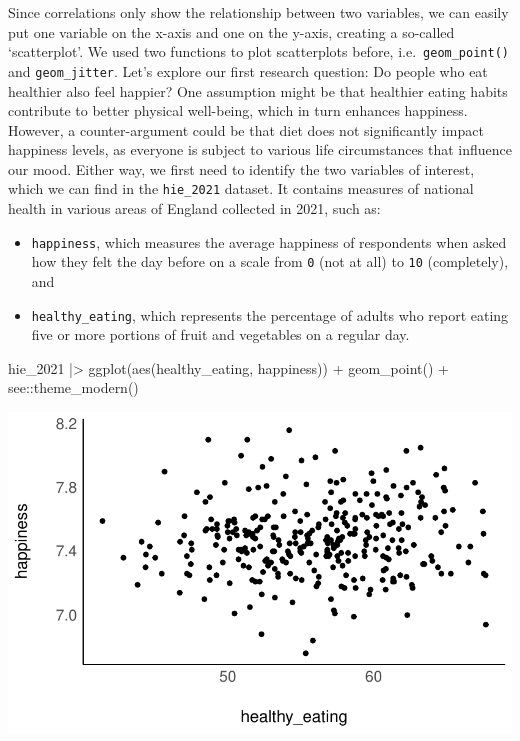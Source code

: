\documentclass[
  letterpaper,
]{krantz}
\makeatletter
\newenvironment{Shaded}{\begin{snugshade}}{\end{snugshade}}
\newcommand{\FunctionTok}[1]{\textcolor[rgb]{0.28,0.35,0.67}{#1}}
\newcommand{\NormalTok}[1]{\textcolor[rgb]{0.00,0.23,0.31}{#1}}
\newcommand{\SpecialCharTok}[1]{\textcolor[rgb]{0.37,0.37,0.37}{#1}}
\newenvironment{kframe}{%
\medskip{}
\setlength{\fboxsep}{.8em}
 \def\at@end@of@kframe{}%
 \ifinner\ifhmode%
  \def\at@end@of@kframe{\end{minipage}}%
  \begin{minipage}{\columnwidth}%
 \fi\fi%
 \def\FrameCommand##1{\hskip\@totalleftmargin \hskip-\fboxsep
 \colorbox{shadecolor}{##1}\hskip-\fboxsep
     \hskip-\linewidth \hskip-\@totalleftmargin \hskip\columnwidth}%
 \MakeFramed {\advance\hsize-\width
   \@totalleftmargin\z@ \linewidth\hsize
   \@setminipage}}%
 {\par\unskip\endMakeFramed%
 \at@end@of@kframe}
\renewenvironment{Shaded}{\begin{kframe}}{\end{kframe}}
\makeatother
\begin{document}
Since correlations only show the relationship between two variables, we
can easily put one variable on the x-axis and one on the y-axis,
creating a so-called `scatterplot'. We used two functions to plot
scatterplots before, i.e.~\texttt{geom\_point()} and
\texttt{geom\_jitter}. Let's explore our first research question: Do
people who eat healthier also feel happier? One assumption might be that
healthier eating habits contribute to better physical well-being, which
in turn enhances happiness. However, a counter-argument could be that
diet does not significantly impact happiness levels, as everyone is
subject to various life circumstances that influence our mood. Either
way, we first need to identify the two variables of interest, which we
can find in the \texttt{hie\_2021} dataset. It contains measures of
national health in various areas of England collected in 2021, such as:

\begin{itemize}
\item
  \texttt{happiness}, which measures the average happiness of
  respondents when asked how they felt the day before on a scale from
  \texttt{0} (not at all) to \texttt{10} (completely), and
\item
  \texttt{healthy\_eating}, which represents the percentage of adults
  who report eating five or more portions of fruit and vegetables on a
  regular day.
\end{itemize}

\begin{Shaded}
\begin{Highlighting}[]
\NormalTok{hie\_2021 }\SpecialCharTok{|\textgreater{}}
  \FunctionTok{ggplot}\NormalTok{(}\FunctionTok{aes}\NormalTok{(healthy\_eating, happiness)) }\SpecialCharTok{+}
  \FunctionTok{geom\_point}\NormalTok{() }\SpecialCharTok{+}
\NormalTok{  see}\SpecialCharTok{::}\FunctionTok{theme\_modern}\NormalTok{()}
\end{Highlighting}
\end{Shaded}

\includegraphics{10_correlations_files/figure-pdf/correlation-happiness-healthy-eating-1.pdf}
\end{document}

